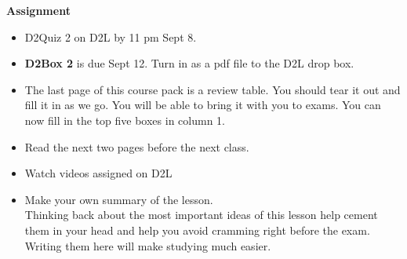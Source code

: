 {\bf Assignment}
\begin{itemize}
\item   D2Quiz 2 on D2L by 11 pm Sept 8.
\item  {\bf D2Box 2} is due Sept 12.  Turn in as a pdf file to the D2L
  drop box.
\item The last page of this course pack  is a review table. You should
  tear it out and fill it in as we go. You will be able to bring it
  with you to exams.  You can now fill in the top five boxes  in column 1.
\item Read the next two pages before the next class.
\item Watch videos assigned on D2L   
 \item 
  Make your own summary of the lesson. \\
  Thinking back about the most important ideas of this lesson help
  cement them in your head and help you avoid cramming right before
  the exam.  Writing them here will make studying much easier.   
\end{itemize}


